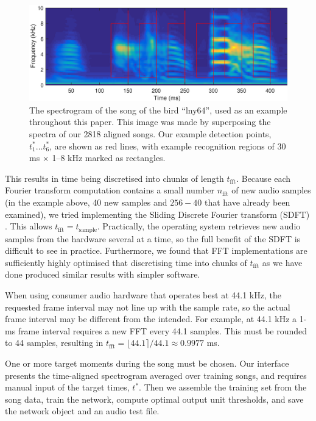 \documentclass[10pt,letterpaper]{article}
\begin{document}
\begin{figure}
  \includegraphics[width=\textwidth]{Fig1}
  \caption{The spectrogram of the song of the bird ``lny64'', used as an example
    throughout this paper.  This image was made by superposing the
    spectra of our 2818 aligned songs.  Our example detection points,
    $t^*_1\ldots t^*_6$, are shown as red lines, with example recognition
    regions of 30 ms $\times$ 1--8 kHz marked as rectangles.}
  \label{fig:song}
\end{figure}



This results in time being discretised into chunks of length
$t_\mathrm{fft}$.  Because each Fourier transform computation contains
a small number $n_\mathrm{fft}$ of new audio samples (in the example
above, 40 new samples and $256-40$ that have already been examined),
we tried implementing the Sliding Discrete Fourier transform (SDFT)
\cite{Jacobsen2003SlidingDFT}.  This allows
$t_\textrm{fft}=t_\textrm{sample}$.  Practically, the operating system
retrieves new audio samples from the hardware several at a time, so
the full benefit of the SDFT is difficult to see in practice.
Furthermore, we found that FFT implementations are sufficiently highly
optimised that discretising time into chunks of $t_\mathrm{fft}$ as we
have done produced similar results with simpler software.

When using consumer audio hardware that operates best at 44.1 kHz, the
requested frame interval may not line up with the sample rate, so the
actual frame interval may be different from the intended.  For
example, at 44.1 kHz a 1-ms frame interval requires a new FFT every
44.1 samples.  This must be rounded to 44 samples, resulting in
$t_\textrm{fft}=\lfloor 44.1 \rceil / 44.1 \approx 0.9977$ ms.

One or more target moments during the song must be chosen.  Our
interface presents the time-aligned spectrogram averaged over training
songs, and requires manual input of the target times, $t^*$.  Then we
assemble the training set from the song data, train the network,
compute optimal output unit thresholds, and save the network object
and an audio test file.
\end{document}
